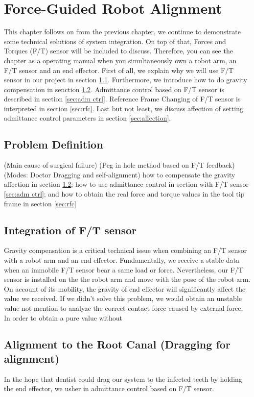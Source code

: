 \chapter{Force-Guided Robot Alignment}
This chapter follows on from the previous chapter, we continue to demonstrate some technical solutions of system integration. On top of that, Forces and Torques (F/T) sensor will be included to discuss. Therefore, you can see the chapter as a operating manual when you simultaneously own a robot arm, an F/T sensor and an end effector. First of all, we explain why we will use F/T sensor in our project in section \ref{sec:pro def}. Furthermore, we introduce how to do gravity compensation in senction \ref{sec:grav compen}. Admittance control based on F/T sensor is described in section \ref{sec:adm ctrl}. Reference Frame Changing of F/T sensor is interpreted in section \ref{sec:rfc}. Last but not least, we discuss affection of setting admittance control parameters in section \ref{sec:affection}.
\section{Problem Definition}
\label{sec:pro def}
(Main cause of surgical failure)
(Peg in hole method based on F/T feedback)
(Modes: Doctor Dragging and self-alignment)
how to compensate the gravity affection in section \ref{sec:grav compen}; how to use admittance control in section with F/T sensor \ref{sec:adm ctrl}; and how to obtain the real force and torque values in the tool tip frame in section \ref{sec:rfc}
\section{Integration of F/T sensor}
\label{sec:grav compen}
Gravity compensation is a critical technical issue when combining an F/T sensor with a robot arm and an end effector. Fundamentally, we receive a stable data when an immobile F/T sensor bear a same load or force. Nevertheless, our F/T sensor is installed on the the robot arm and move with the pose of the robot arm. On account of its mobility, the gravity of end effector will significantly affect the value we received. If we didn't solve this problem, we would obtain an unstable value not mention to analyze the correct contact force caused by external force. In order to obtain a pure value without 
\section{Alignment to the Root Canal (Dragging for alignment)}
In the hope that dentist could drag our system to the infected teeth by holding the end effector, we usher in admittance control based on F/T sensor.
